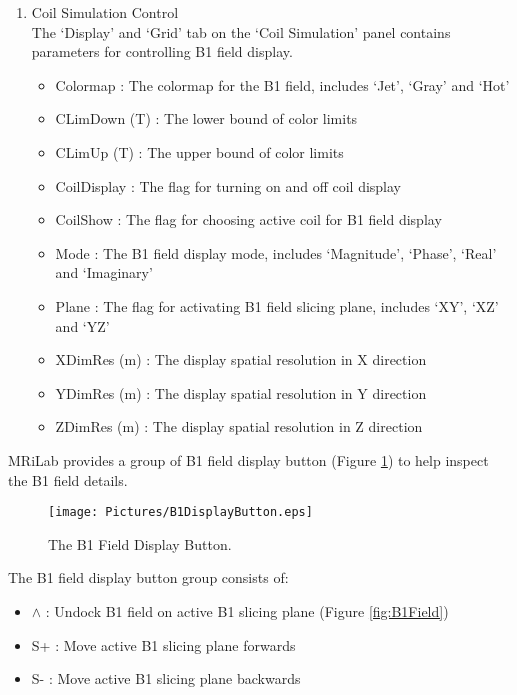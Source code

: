 \documentclass{book}%
\begin{document}
\begin{enumerate}
	\item Coil Simulation Control \\

The `Display' and `Grid' tab on the `Coil Simulation' panel contains parameters for controlling B1 field display.

\begin{itemize}
	\item Colormap : The colormap for the B1 field, includes `Jet', `Gray' and `Hot'
	\item CLimDown (T) : The lower bound of color limits
	\item CLimUp (T) : The upper bound of color limits
	\item CoilDisplay : The flag for turning on and off coil display
	\item CoilShow : The flag for choosing active coil for B1 field display
	\item Mode : The B1 field display mode, includes `Magnitude', `Phase', `Real' and `Imaginary'
	\item Plane : The flag for activating B1 field slicing plane, includes `XY', `XZ' and `YZ'
	\item XDimRes (m) : The display spatial resolution in X direction
	\item YDimRes (m) : The display spatial resolution in Y direction
	\item ZDimRes (m) : The display spatial resolution in Z direction
\end{itemize}	

\end{enumerate}

MRiLab provides a group of B1 field display button (Figure \ref{fig:B1DisplayButton}) to help inspect the B1 field details.

\begin{figure}[htbp]
	\centering
		\texttt{[image: Pictures/B1DisplayButton.eps]}
	\caption{The B1 Field Display Button.}
	\label{fig:B1DisplayButton}
\end{figure}

The B1 field display button group consists of:

\begin{itemize}
	\item $\wedge$ : Undock B1 field on active B1 slicing plane (Figure \ref{fig:B1Field})
	\item S+ : Move active B1 slicing plane forwards
	\item S- : Move active B1 slicing plane backwards
\end{itemize}
\end{document}
